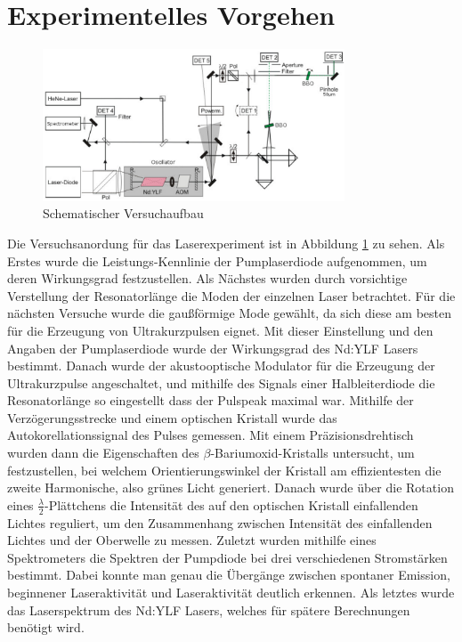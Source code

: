 \section{Experimentelles Vorgehen}
\begin{figure}[]
  \centering
  \includegraphics[width = 0.8\textwidth]{Bilder/Versuchsaufbau.png}
  \caption{Schematischer Versuchaufbau}
  \label{fig:versuchsaufbau}
\end{figure}
Die Versuchsanordung für das Laserexperiment ist in Abbildung \ref{fig:versuchsaufbau}
zu sehen. Als Erstes wurde die Leistungs-Kennlinie der Pumplaserdiode aufgenommen, um deren Wirkungsgrad festzustellen.
Als Nächstes wurden durch vorsichtige Verstellung der Resonatorlänge die Moden der einzelnen Laser betrachtet.
Für die nächsten Versuche wurde die gaußförmige Mode gewählt, da sich diese am besten für
die Erzeugung von Ultrakurzpulsen eignet.
Mit dieser Einstellung und den Angaben der Pumplaserdiode wurde der
Wirkungsgrad des Nd:YLF Lasers bestimmt. 
Danach wurde der akustooptische Modulator für die Erzeugung der Ultrakurzpulse angeschaltet, und mithilfe des Signals einer Halbleiterdiode die Resonatorlänge so eingestellt dass der Pulspeak maximal war.
Mithilfe der Verzögerungsstrecke und einem optischen Kristall wurde das Autokorellationssignal des Pulses gemessen.
Mit einem Präzisionsdrehtisch wurden dann die Eigenschaften des $\beta$-Bariumoxid-Kristalls untersucht, um festzustellen, bei welchem Orientierungswinkel der Kristall am effizientesten die zweite Harmonische, also grünes Licht generiert.
Danach wurde über die Rotation eines $\frac{\lambda}{2}$-Plättchens die Intensität des auf den optischen Kristall einfallenden Lichtes reguliert, um den Zusammenhang zwischen Intensität des einfallenden Lichtes und der Oberwelle zu messen.
Zuletzt wurden mithilfe eines Spektrometers die Spektren der Pumpdiode bei drei verschiedenen Stromstärken bestimmt. Dabei konnte man genau die Übergänge zwischen spontaner Emission, beginnener Laseraktivität und Laseraktivität deutlich erkennen. Als letztes wurde das Laserspektrum des Nd:YLF Lasers, welches für spätere Berechnungen benötigt wird.

